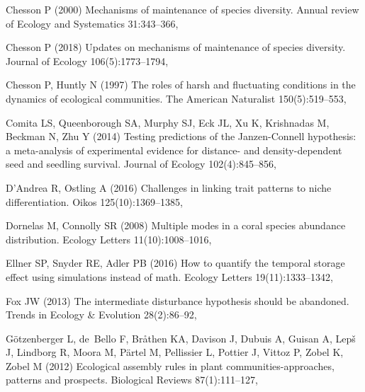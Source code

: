 \documentclass[a4paper,12pt]{article}
\begin{document}
\begin{thebibliography}{56}
Chesson P (2000) Mechanisms of maintenance of species diversity. Annual review
  of Ecology and Systematics 31:343--366,

Chesson P (2018) Updates on mechanisms of maintenance of species diversity.
  Journal of Ecology 106(5):1773--1794, 

Chesson P, Huntly N (1997) The roles of harsh and fluctuating conditions in the
  dynamics of ecological communities. The American Naturalist 150(5):519--553,

Comita LS, Queenborough SA, Murphy SJ, Eck JL, Xu K, Krishnadas M, Beckman N,
  Zhu Y (2014) {Testing predictions of the Janzen-Connell hypothesis: a
  meta-analysis of experimental evidence for distance- and density-dependent
  seed and seedling survival}. Journal of Ecology 102(4):845--856,

D'Andrea R, Ostling A (2016) Challenges in linking trait patterns to niche
  differentiation. Oikos 125(10):1369--1385, 

Dornelas M, Connolly SR (2008) Multiple modes in a coral species abundance
  distribution. Ecology Letters 11(10):1008--1016,

Ellner SP, Snyder RE, Adler PB (2016) How to quantify the temporal storage
  effect using simulations instead of math. Ecology Letters 19(11):1333--1342,

Fox JW (2013) The intermediate disturbance hypothesis should be abandoned.
  Trends in Ecology \& Evolution 28(2):86--92, 

G\"{o}tzenberger L, de~Bello F, Br\r{a}then KA, Davison J, Dubuis A, Guisan A,
  Lep\v{s} J, Lindborg R, Moora M, P\"{a}rtel M, Pellissier L, Pottier J,
  Vittoz P, Zobel K, Zobel M (2012) Ecological assembly rules in plant
  communities-approaches, patterns and prospects. Biological Reviews
  87(1):111--127, 


\end{thebibliography}
\end{document}
